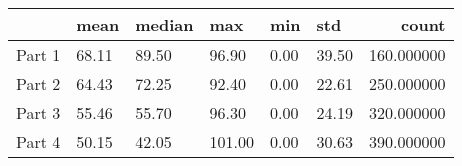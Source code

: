 \begin{tabular}{llllllr}
\toprule
 & mean & median & max & min & std & count \\
\midrule
Part 1 & 68.11 & 89.50 & 96.90 & 0.00 & 39.50 & 160.000000 \\
Part 2 & 64.43 & 72.25 & 92.40 & 0.00 & 22.61 & 250.000000 \\
Part 3 & 55.46 & 55.70 & 96.30 & 0.00 & 24.19 & 320.000000 \\
Part 4 & 50.15 & 42.05 & 101.00 & 0.00 & 30.63 & 390.000000 \\
\bottomrule
\end{tabular}

